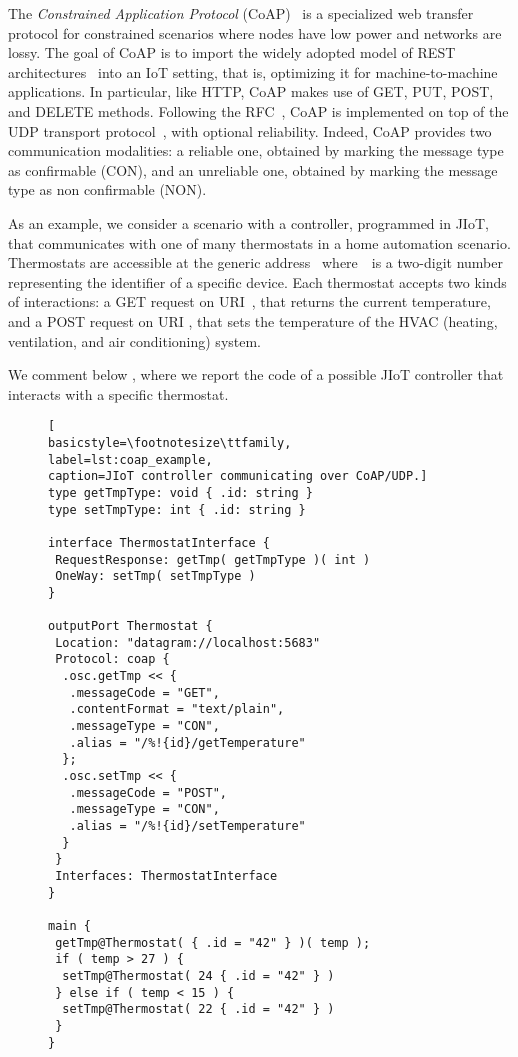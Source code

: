 The \textit{Constrained Application Protocol}
(CoAP)~\cite{coap,doi:10.17487/RFC7252} is a specialized web transfer protocol
for constrained scenarios where nodes have low power and networks are lossy. The
goal of CoAP is to import the widely adopted model of REST
architectures~\cite{fielding00} into an IoT setting, that is, optimizing it for
machine-to-machine applications. In particular, like HTTP,
CoAP makes use of GET, PUT,
POST, and DELETE methods.
%
Following the RFC~\cite{doi:10.17487/RFC7252}, CoAP is implemented on top of the
UDP transport protocol~\cite{UDP}, with optional reliability. Indeed, CoAP
provides two communication modalities: a reliable one, obtained by marking the
message type as confirmable (CON), and an unreliable one, obtained by marking the
message type as non confirmable (NON).

As an example, we consider a scenario with a controller, programmed in
JIoT, that communicates with one of many thermostats
in a home automation scenario.
Thermostats are accessible at the generic address~
where~~is a two-digit number representing the identifier
of a specific device.
Each thermostat accepts two kinds of interactions: a GET request on
URI~,
that returns the current temperature, and a POST
request on URI ,
that sets the temperature of the HVAC (heating, ventilation, and air
conditioning) system.

We comment below , where we report the code of a
possible JIoT controller that interacts with a specific thermostat.

\begin{figure}[t]
\begin{lstlisting}[
basicstyle=\footnotesize\ttfamily,
label=lst:coap_example,
caption=JIoT controller communicating over CoAP/UDP.]
type getTmpType: void { .id: string }
type setTmpType: int { .id: string }

interface ThermostatInterface {
 RequestResponse: getTmp( getTmpType )( int )
 OneWay: setTmp( setTmpType )
}

outputPort Thermostat {
 Location: "datagram://localhost:5683"
 Protocol: coap {
  .osc.getTmp << {
   .messageCode = "GET",
   .contentFormat = "text/plain",
   .messageType = "CON",
   .alias = "/%!{id}/getTemperature"
  };
  .osc.setTmp << {
   .messageCode = "POST",
   .messageType = "CON",
   .alias = "/%!{id}/setTemperature"
  }
 }
 Interfaces: ThermostatInterface
}

main {
 getTmp@Thermostat( { .id = "42" } )( temp );
 if ( temp > 27 ) {
  setTmp@Thermostat( 24 { .id = "42" } )
 } else if ( temp < 15 ) {
  setTmp@Thermostat( 22 { .id = "42" } )
 }
}
\end{lstlisting}
\end{figure}

